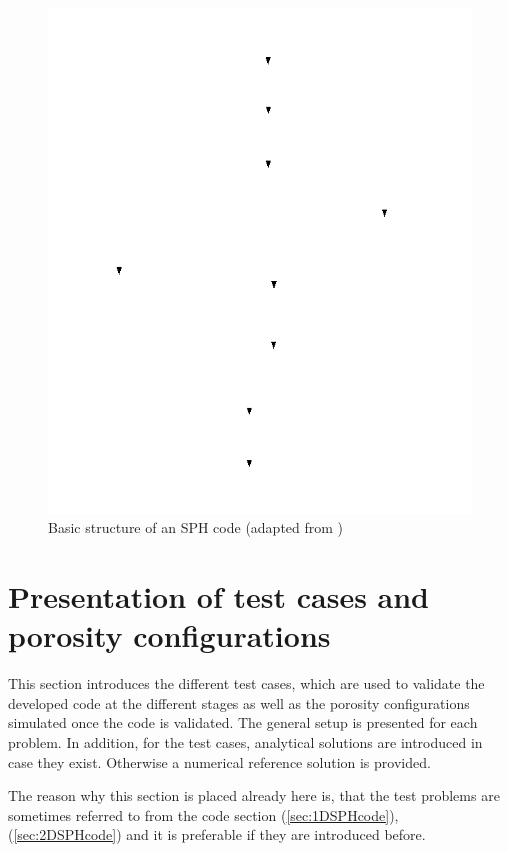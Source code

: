 \documentclass[11pt,a4paper,twoside]{report}
\begin{document}
\begin{figure}[!htbp]
  \centering
     \includegraphics[width=1.0\textwidth]{Graphics/general_structure_SPH}
  \caption{Basic structure of an SPH code (adapted from \cite{Liu2003}) }
  \label{fig:BasicSphCode}
\end{figure}

\section{Presentation of test cases and porosity configurations}
\label{sec:GenIntroTestCases}
 
This section introduces the different test cases, which are used to validate the developed code at the different stages as well as the porosity configurations simulated once the code is validated. The general setup is presented for each problem. In addition, for the test cases,  analytical solutions are introduced in case they exist. Otherwise a numerical reference solution is provided.

The reason why this section is placed already here is, that the test problems are sometimes referred to from the code section (\ref{sec:1DSPHcode}),(\ref{sec:2DSPHcode}) and it is preferable if they are introduced before.
\end{document}
